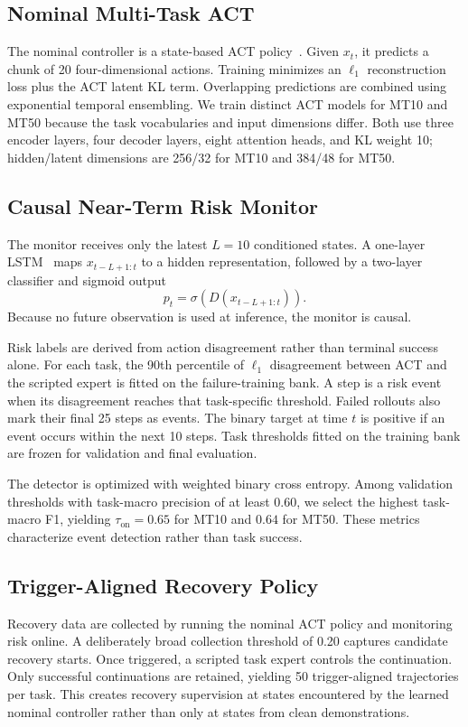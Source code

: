 \documentclass[conference]{IEEEtran}
\newcommand{\risk}{p_t}
\begin{document}
\subsection{Nominal Multi-Task ACT}
The nominal controller is a state-based ACT policy~\cite{zhao2023act}. Given $x_t$, it predicts a chunk of 20 four-dimensional actions. Training minimizes an $\ell_1$ reconstruction loss plus the ACT latent KL term. Overlapping predictions are combined using exponential temporal ensembling. We train distinct ACT models for MT10 and MT50 because the task vocabularies and input dimensions differ. Both use three encoder layers, four decoder layers, eight attention heads, and KL weight 10; hidden/latent dimensions are 256/32 for MT10 and 384/48 for MT50.

\subsection{Causal Near-Term Risk Monitor}
The monitor receives only the latest $L=10$ conditioned states. A one-layer LSTM~\cite{hochreiter1997lstm} maps $x_{t-L+1:t}$ to a hidden representation, followed by a two-layer classifier and sigmoid output
\begin{equation}
  \risk=\sigma\!\left(D(x_{t-L+1:t})\right).
\end{equation}
Because no future observation is used at inference, the monitor is causal.

Risk labels are derived from action disagreement rather than terminal success alone. For each task, the 90th percentile of $\ell_1$ disagreement between ACT and the scripted expert is fitted on the failure-training bank. A step is a risk event when its disagreement reaches that task-specific threshold. Failed rollouts also mark their final 25 steps as events. The binary target at time $t$ is positive if an event occurs within the next 10 steps. Task thresholds fitted on the training bank are frozen for validation and final evaluation.

The detector is optimized with weighted binary cross entropy. Among validation thresholds with task-macro precision of at least 0.60, we select the highest task-macro F1, yielding $\tau_{\mathrm{on}}=0.65$ for MT10 and $0.64$ for MT50. These metrics characterize event detection rather than task success.

\subsection{Trigger-Aligned Recovery Policy}
Recovery data are collected by running the nominal ACT policy and monitoring risk online. A deliberately broad collection threshold of 0.20 captures candidate recovery starts. Once triggered, a scripted task expert controls the continuation. Only successful continuations are retained, yielding 50 trigger-aligned trajectories per task. This creates recovery supervision at states encountered by the learned nominal controller rather than only at states from clean demonstrations.
\end{document}
